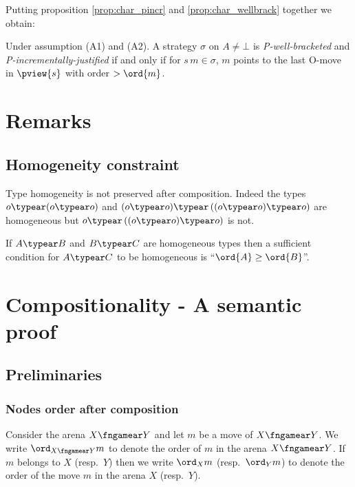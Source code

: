 Putting proposition \ref{prop:char_pincr} and
\ref{prop:char_wellbrack} together we obtain:
\begin{proposition}
Under assumption (A1) and (A2).
A strategy $\sigma$ on $A\neq \bot$
is \emph{P-well-bracketed} and
 \emph{P-incrementally-justified} if and only if
for $s \, m \in \sigma$, $m$ points to the last O-move in $\pview{s}$ with order $>\ord{m}$.
\end{proposition}


\section{Remarks}
\subsection{Homogeneity constraint}

Type homogeneity is not preserved after composition. Indeed the types  $o \typear (o \typear o)$ and $(o \typear o) \typear \left((o \typear o) \typear o \right)$ are homogeneous
but $o \typear \left((o \typear o) \typear o\right)$ is not.

If $A\typear B$ and $B \typear C$ are homogeneous types then  a sufficient condition for $A\typear C$ to be homogeneous is  ``$\ord{A} \geq \ord{B}$''.


\section{Compositionality - A semantic proof}

\subsection{Preliminaries}
 
\subsubsection{Nodes order after composition}

Consider the arena $X\fngamear Y$
and let $m$ be a move of $X\fngamear Y$.
We write $\ord_{X\fngamear Y}{m}$
to denote the order of 
$m$ in the arena ${X\fngamear Y}$.
If $m$ belongs to $X$ (resp.~$Y$) then
we write $\ord_X{m}$ 
(resp.~$\ord_Y{m}$) to denote the order of the move $m$ in the arena $X$ (resp.~$Y$).

